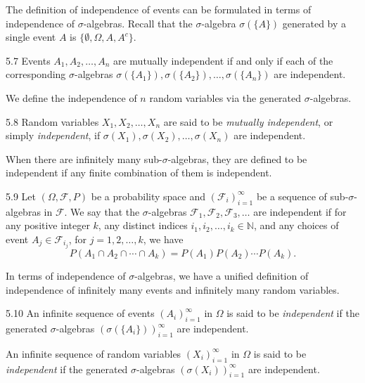 The definition of independence of events can be formulated in terms of independence of $\sigma$-algebras. Recall that the $\sigma$-algebra $\sigma(\{A\})$ generated by a single event $A$ is $\{\emptyset,\Omega,A,A^c\}$.

\begin{thmbox}{5.7}
Events $A_1,A_2,\ldots,A_n$ are mutually independent if and only if each of the corresponding $\sigma$-algebras $\sigma(\{A_1\}),\sigma(\{A_2\}),\ldots,\sigma(\{A_n\})$ are independent.
\end{thmbox}

We define the independence of $n$ random variables via the generated $\sigma$-algebras.

\begin{defbox}{5.8}
Random variables $X_1,X_2,\ldots,X_n$ are said to be \textit{mutually independent}, or simply \textit{independent}, if $\sigma(X_1),\sigma(X_2),\ldots,\sigma(X_n)$ are independent.
\end{defbox}

When there are infinitely many sub-$\sigma$-algebras, they are defined to be independent if any finite combination of them is independent.

\begin{defbox}{5.9}
Let $(\Omega,\mathcal{F},P)$ be a probability space and $(\mathcal{F}_i)_{i=1}^{\infty}$ be a sequence of sub-$\sigma$-algebras in $\mathcal{F}$. We say that the $\sigma$-algebras $\mathcal{F}_1,\mathcal{F}_2,\mathcal{F}_3,\ldots$ are independent if for any positive integer $k$, any distinct indices $i_1,i_2,\ldots,i_k \in \mathbb{N}$, and any choices of event $A_j \in \mathcal{F}_{i_j}$, for $j=1,2,\ldots,k$, we have
\[
P(A_1 \cap A_2 \cap \cdots \cap A_k)=P(A_1)P(A_2)\cdots P(A_k).
\]
\end{defbox}

In terms of independence of $\sigma$-algebras, we have a unified definition of independence of infinitely many events and infinitely many random variables.

\begin{defbox}{5.10}
An infinite sequence of events $(A_i)_{i=1}^{\infty}$ in $\Omega$ is said to be \textit{independent} if the generated $\sigma$-algebras $(\sigma(\{A_i\}))_{i=1}^{\infty}$ are independent.

An infinite sequence of random variables $(X_i)_{i=1}^{\infty}$ in $\Omega$ is said to be \textit{independent} if the generated $\sigma$-algebras $(\sigma(X_i))_{i=1}^{\infty}$ are independent.
\end{defbox}

